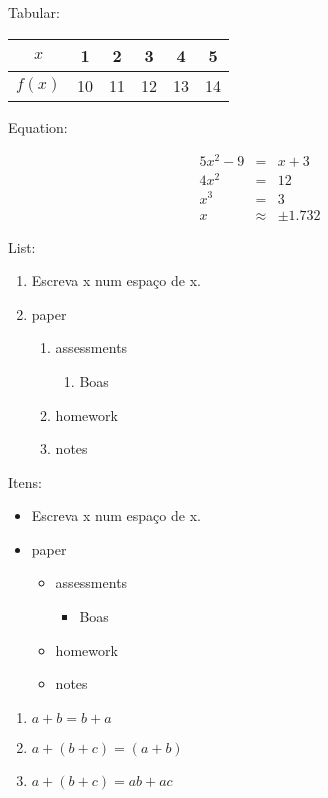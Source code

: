 \documentclass[a4paper,10pt]{article}
\begin{document}
Tabular:\\
\begin{tabular}{|c|ccccc|}

\hline
 $x$ & 1 & 2 & 3 & 4 & 5  \\\hline
 $f(x)$ & 10 & 11 & 12 & 13 & 14\\ \hline
 
 \end{tabular}

 \newpage
 Equation:
 
 \begin{eqnarray}%
  5x^2-9&=&x+3\\%
  4x^2&=&12\\
  x^3&=&3\\
  x&\approx&\pm1.732
 \end{eqnarray}

 List:
 \begin{enumerate}
  \item Escreva x num espaço de x.
  \item paper
  \begin{enumerate}
   \item assessments
   \begin {enumerate}
   \item Boas
   \end {enumerate}
   \item homework
   \item notes
  \end{enumerate}
 \end{enumerate}  

 Itens:
 \begin{itemize}
  \item Escreva x num espaço de x.
  \item paper
  \begin{itemize}
   \item assessments
   \begin {itemize}
   \item Boas
   \end {itemize}
   \item homework
   \item notes
  \end{itemize}
 \end{itemize}  

 \begin{enumerate}
  \item $a+b=b+a$
  \item$a+(b+c)=(a+b)$
  \item$a+(b+c)=ab+ac$
 \end{enumerate}

 
\end{document}

